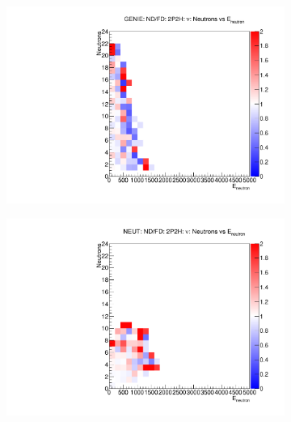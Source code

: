 \documentclass[12pt]{article}
\begin{document}
\begin{figure}
\centering
\begin{subfigure}[b]{0.32\textwidth}
  \includegraphics[width=\textwidth]{nneutrons_v_total_ene/Nneutrons_Total_ENe_2p2h_GENIE_ND_FD_numu_norm.pdf}
\end{subfigure}
\begin{subfigure}[b]{0.32\textwidth}
  \includegraphics[width=\textwidth]{nneutrons_v_total_ene/Nneutrons_Total_ENe_2p2h_NEUT_ND_FD_numu_norm.pdf}
\end{subfigure}
\begin{subfigure}[b]{0.32\textwidth}

\end{subfigure}
\end{figure}
\end{document}
